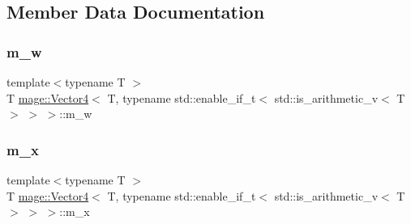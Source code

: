 \subsection{Member Data Documentation}
\hypertarget{structmage_1_1_vector4_3_01_t_00_01typename_01std_1_1enable__if__t_3_01std_1_1is__arithmetic__v_3_01_t_01_4_01_4_01_4_a04fbebeebf449c261d446f4b484cf387}{}\label{structmage_1_1_vector4_3_01_t_00_01typename_01std_1_1enable__if__t_3_01std_1_1is__arithmetic__v_3_01_t_01_4_01_4_01_4_a04fbebeebf449c261d446f4b484cf387} 
\subsubsection{\texorpdfstring{m\+\_\+w}{m\_w}}
{\footnotesize\ttfamily template$<$typename T $>$ \\
T \hyperlink{structmage_1_1_vector4}{mage\+::\+Vector4}$<$ T, typename std\+::enable\+\_\+if\+\_\+t$<$ std\+::is\+\_\+arithmetic\+\_\+v$<$ T $>$ $>$ $>$\+::m\+\_\+w}

\hypertarget{structmage_1_1_vector4_3_01_t_00_01typename_01std_1_1enable__if__t_3_01std_1_1is__arithmetic__v_3_01_t_01_4_01_4_01_4_a4baf276130c181cb4517b4d26452a163}{}\label{structmage_1_1_vector4_3_01_t_00_01typename_01std_1_1enable__if__t_3_01std_1_1is__arithmetic__v_3_01_t_01_4_01_4_01_4_a4baf276130c181cb4517b4d26452a163} 
\subsubsection{\texorpdfstring{m\+\_\+x}{m\_x}}
{\footnotesize\ttfamily template$<$typename T $>$ \\
T \hyperlink{structmage_1_1_vector4}{mage\+::\+Vector4}$<$ T, typename std\+::enable\+\_\+if\+\_\+t$<$ std\+::is\+\_\+arithmetic\+\_\+v$<$ T $>$ $>$ $>$\+::m\+\_\+x}

